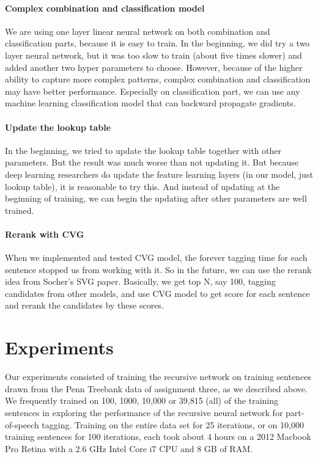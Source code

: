 \documentclass[11pt]{article}
\begin{document}
\paragraph{Complex combination and classification model}
We are using one layer linear neural network on both combination and classification parts, because it is easy to train. In the beginning, we did try a two layer neural network, but it was too slow to train (about five times slower) and added another two hyper parameters to choose. However, because of the higher ability to capture more complex patterns, complex combination and classification may have better performance. Especially on classification part, we can use any machine learning classification model that can backward propagate gradients.

\paragraph{Update the lookup table}
In the beginning, we tried to update the lookup table together with other parameters. But the result was much worse than not updating it. But because deep learning researchers do update the feature learning layers (in our model, just lookup table), it is reasonable to try this. And instead of updating at the beginning of training, we can begin the updating after other parameters are well trained.

\paragraph{Rerank with CVG}
When we implemented and tested CVG model, the forever tagging time for each sentence stopped us from working with it. So in the future, we can use the rerank idea from Socher's SVG paper. Basically, we get top N, say 100, tagging candidates from other models, and use CVG model to get score for each sentence and rerank the candidates by these scores.

\section{Experiments}

Our experiments consisted of training the recursive network on training sentences drawn from the Penn Treebank data of assignment three, as we described above. We frequently trained on 100, 1000, 10,000 or 39,815 (all) of the training sentences in exploring the performance of the recursive neural network for part-of-speech tagging. Training on the entire data set for 25 iterations, or on 10,000 training sentences for 100 iterations, each took about 4 hours on a 2012 Macbook Pro Retina with a 2.6 GHz Intel Core i7 CPU and 8 GB of RAM.
\end{document}
